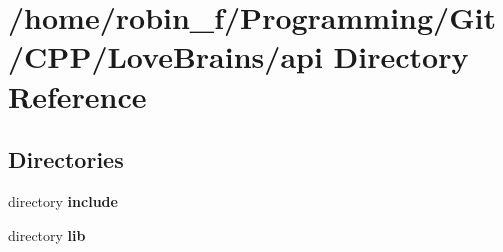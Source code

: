 \section{/home/robin\+\_\+f/\+Programming/\+Git/\+C\+P\+P/\+Love\+Brains/api Directory Reference}
\label{dir_76d3cb1dfd4a12ac087842f1406382a2}
\subsection*{Directories}
\begin{DoxyCompactItemize}
\item 
directory {\bf include}
\item 
directory {\bf lib}
\end{DoxyCompactItemize}
